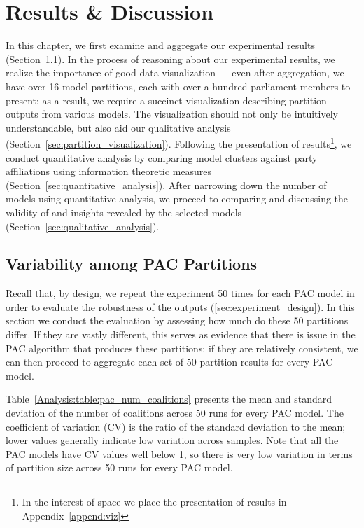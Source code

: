 
\chapter{Results \& Discussion}
\label{ch:analysis}

In this chapter, we first examine and aggregate our experimental results
(Section~\ref{sec:variability_among_pac_partitions}).
In the process of reasoning about our experimental results, we realize the
importance of good data visualization --- even after aggregation, we have over
16 model partitions, each with over a hundred parliament members to present;
as a result, we require a succinct visualization describing partition outputs
from various models.
The visualization should not only be intuitively understandable, but also aid
our qualitative analysis (Section~\ref{sec:partition_visualization}).
Following the presentation of results\footnote{In the interest of space we
place the presentation of results in Appendix~\ref{append:viz}}, we conduct
quantitative analysis by comparing model clusters against party affiliations
using information theoretic measures (Section~\ref{sec:quantitative_analysis}).
After narrowing down the number of models using quantitative analysis, we
proceed to comparing and discussing the validity of and insights revealed by
the selected models (Section~\ref{sec:qualitative_analysis}).


\section{Variability among PAC Partitions}
\label{sec:variability_among_pac_partitions}
Recall that, by design, we repeat the experiment 50 times for each PAC model
in order to evaluate the robustness of the outputs (\autoref{sec:experiment_design}).
In this section we conduct the evaluation by assessing how much do these 50
partitions differ.
If they are vastly different, this serves as evidence that there is issue in the
PAC algorithm that produces these partitions; if they are relatively consistent,
we can then proceed to aggregate each set of 50 partition results for every PAC
model.

Table~\ref{Analysis:table:pac_num_coalitions} presents the mean and standard
deviation of the number of coalitions across 50 runs for every PAC model.
The coefficient of variation (CV) is the ratio of the standard deviation to the mean; lower values generally indicate low variation across samples.
Note that all the PAC models have CV values well below 1, so there is very low
variation in terms of partition size across 50 runs for every PAC model.

